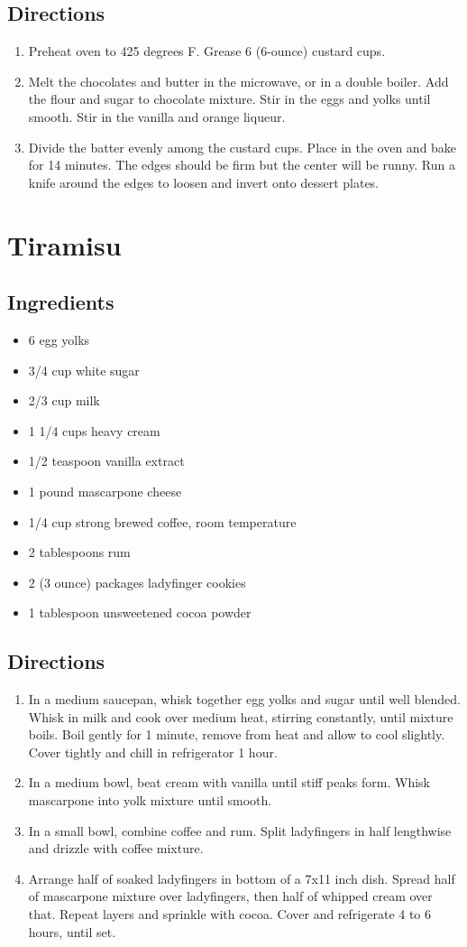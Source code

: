 \documentclass[oneside,11pt]{book}
\newcommand{\Ingredients}[1]{
	\subsection*{Ingredients}
	\begin{itemize} 
	  #1 
	\end{itemize}
}
\newcommand{\Directions}[1]{
	\subsection*{Directions}
	\begin{enumerate} 
	  #1 
	\end{enumerate}
}
\newcommand{\recipe}[1]{
	\section*{ \hspace{-12pt} #1 }
	\addcontentsline{toc}{section}{ \hspace{-6pt} #1 }
}
\begin{document}
    \Directions{
      \item Preheat oven to 425 degrees F. Grease 6 (6-ounce) custard cups. 
      \item Melt the chocolates and butter in the microwave, or in a double boiler. 
        Add the flour and sugar to chocolate mixture. Stir in the eggs and yolks until smooth. 
        Stir in the vanilla and orange liqueur. 
      \item Divide the batter evenly among the custard cups. 
        Place in the oven and bake for 14 minutes. 
        The edges should be firm but the center will be runny. 
        Run a knife around the edges to loosen and invert onto dessert plates.
    }
  
  \recipe{Tiramisu}
    \Ingredients{
      \item 6 egg yolks 
      \item 3/4 cup white sugar 
      \item 2/3 cup milk 
      \item 1 1/4 cups heavy cream 
      \item 1/2 teaspoon vanilla extract 
      \item 1 pound mascarpone cheese 
      \item 1/4 cup strong brewed coffee, room temperature
      \item 2 tablespoons rum 
      \item 2 (3 ounce) packages ladyfinger cookies 
      \item 1 tablespoon unsweetened cocoa powder
    }
    \Directions{
      \item In a medium saucepan, whisk together egg yolks and sugar until well blended. 
        Whisk in milk and cook over medium heat, stirring constantly, until mixture boils. 
        Boil gently for 1 minute, remove from heat and allow to cool slightly. 
        Cover tightly and chill in refrigerator 1 hour.
      \item In a medium bowl, beat cream with vanilla until stiff peaks form. 
        Whisk mascarpone into yolk mixture until smooth.
      \item In a small bowl, combine coffee and rum. 
        Split ladyfingers in half lengthwise and drizzle with coffee mixture.
      \item Arrange half of soaked ladyfingers in bottom of a 7x11 inch dish. 
        Spread half of mascarpone mixture over ladyfingers, then half of whipped cream over that. 
        Repeat layers and sprinkle with cocoa. Cover and refrigerate 4 to 6 hours, until set.
    }
\end{document}
